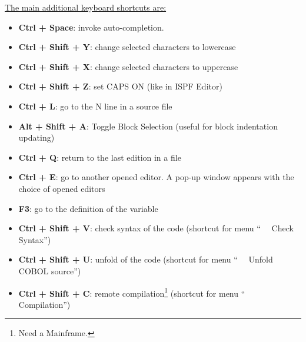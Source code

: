 \pagebreak
\underline{The main additional keyboard shortcuts are:}

\begin{itemize}[label=\textbullet,font=\color{ColorOneDoc},leftmargin=1cm]
\item \textbf{Ctrl + Space}: invoke auto-completion.

\item \textbf{Ctrl + Shift + Y}: change selected characters to lowercase

\item \textbf{Ctrl + Shift + X}: change selected characters to uppercase

\item \textbf{Ctrl + Shift + Z}: set CAPS ON (like in ISPF Editor)

\item \textbf{Ctrl + L}: go to the N line in a source file

\item \textbf{Alt + Shift + A}: Toggle Block Selection (useful for block indentation updating)

\item \textbf{Ctrl + Q}: return to the last edition in a file

\item \textbf{Ctrl + E}: go to another opened editor. A pop-up window appears with the choice of opened editors

\item \textbf{F3}: go to the definition of the variable

\item \textbf{Ctrl + Shift + V}: check syntax of the code (shortcut for menu ``\mxproduct~\RHD~ Check Syntax'')

\item \textbf{Ctrl + Shift + U}: unfold of the code (shortcut for menu ``\mxproduct~\RHD~ Unfold COBOL source'')

\item \textbf{Ctrl + Shift + C}: remote compilation\footnote{Need a Mainframe.} (shortcut for menu ``\mxproduct~\RHD~ Compilation'')
\end{itemize}


